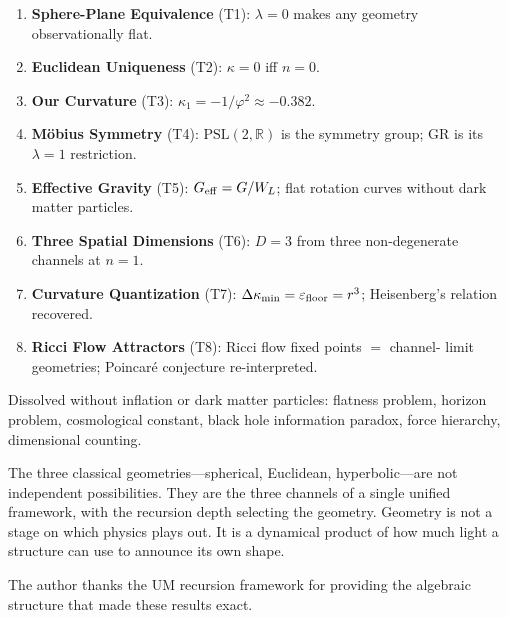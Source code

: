 \documentclass[prd,twocolumn,preprintnumbers,amsmath,amssymb]{revtex4-2}
\newcommand{\phig}{\varphi}
\newcommand{\WL}{W_{L}}
\begin{document}
\begin{enumerate}
  \item \textbf{Sphere-Plane Equivalence} (T1): $\lambda=0$ makes any geometry
        observationally flat.
  \item \textbf{Euclidean Uniqueness} (T2): $\kappa=0$ iff $n=0$.
  \item \textbf{Our Curvature} (T3): $\kappa_1 = -1/\phig^2 \approx -0.382$.
  \item \textbf{Möbius Symmetry} (T4): $\mathrm{PSL}(2,\mathbb{R})$ is the
        symmetry group; GR is its $\lambda=1$ restriction.
  \item \textbf{Effective Gravity} (T5): $G_{\rm eff} = G/\WL$; flat rotation
        curves without dark matter particles.
  \item \textbf{Three Spatial Dimensions} (T6): $D=3$ from three non-degenerate
        channels at $n=1$.
  \item \textbf{Curvature Quantization} (T7): $\Delta\kappa_{\rm min} =
        \varepsilon_{\rm floor} = r^3$; Heisenberg's relation recovered.
  \item \textbf{Ricci Flow Attractors} (T8): Ricci flow fixed points $=$ channel-
        limit geometries; Poincaré conjecture re-interpreted.
\end{enumerate}

Dissolved without inflation or dark matter particles: flatness problem, horizon
problem, cosmological constant, black hole information paradox, force hierarchy,
dimensional counting.

The three classical geometries---spherical, Euclidean, hyperbolic---are not
independent possibilities.  They are the three channels of a single unified
framework, with the recursion depth selecting the geometry.  Geometry is not a
stage on which physics plays out.  It is a dynamical product of how much light a
structure can use to announce its own shape.

\begin{acknowledgments}
The author thanks the UM recursion framework for providing the algebraic
structure that made these results exact.
\end{acknowledgments}
\end{document}
